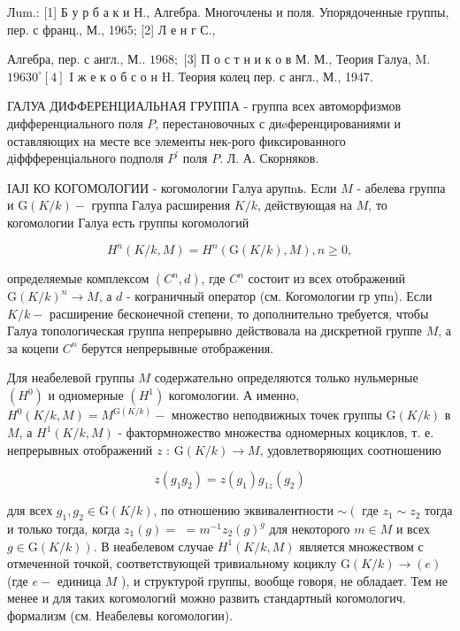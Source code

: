 \documentclass[10pt]{article}
\begin{document}
Лum.: [1] Б у р б а к и Н., Алгебра. Многочлены и поля. Упорядоченные группы, пер. с франц., М., 1965; [2] Л е н г С.,

Алгебра, пер. с англ., М.. $1968 ;$ [3] П о с т н и к о в М. М., Теория Галуа, M. $19630^{\circ}[4]$ I ж е к о б с о н H. Теория колец пер. с англ., М., 1947.



ГАЛУА ДИФФЕРЕНЦИАЛЬНАЯ ГРУППА - группа всех автоморфизмов дифференциального поля $P$, перестановочных с диøференцированиями и оставляющих на месте все элементы нек-рого фиксированного діффференціального подполя $P^{\prime}$ поля $P$. Л. А. Скорняков.



ІАЈІ КО КОГОМОЛОГИИ - когомологии Галуа арупnь. Если $M$ - абелева группа и $\mathrm{G}(K / k)-$ группа Галуа расширения $K / k$, действующая на $M$, то когомологии Галуа есть группы когомологий



\[

H^{n}(K / k, M)=H^{n}(\mathrm{G}(K / k), M), n \geqslant 0,

\]



определяемые комплексом $\left(C^{n}, d\right)$, где $C^{n}$ состоит из всех отображений $\mathrm{G}(K / k)^{n} \rightarrow M$, а $d$ - кограничный оператор (см. Когомологии гр упn). Если $K / k-$ расширение бесконечной степени, то дополнительно требуется, чтобы Галуа топологическая группа непрерывно действовала на дискретной группе $M$, а за коцепи $C^{n}$ берутся непрерывные отображения.



Для неабелевой группы $M$ содержательно определяются только нульмерные $\left(H^{0}\right)$ и одномерные $\left(H^{1}\right)$ когомологии. А именно, $H^{0}(K / k, M)=M^{\mathrm{G}(K / k)}-$ множество неподвижных точек группы $\mathrm{G}(K / k)$ в $M$, а $H^{1}(K / k, M)$ - фактормножество множества одномерных коциклов, т. е. непрерывных отображений $z$ : $\mathrm{G}(K / k) \rightarrow M$, удовлетворяющих соотношению



\[

z\left(g_{1} g_{2}\right)=z\left(g_{1}\right) g_{1 z}\left(g_{2}\right)

\]



для всех $g_{1}, g_{2} \in \mathrm{G}(K / k)$, по отношению эквивалентности $\sim\left(\right.$ где $z_{1} \sim z_{2}$ тогда и только тогда, когда $z_{1}(g)=$ $=m^{-1} z_{2}(g)^{g}$ для некоторого $m \in M$ и всех $\left.g \in \mathrm{G}(K / k)\right)$. В неабелевом случае $H^{1}(K / k, M)$ является множеством с отмеченной точкой, соответствующей тривиальному коциклу $\mathrm{G}(K / k) \rightarrow(e)$ (где $e-$ единица $M$ ), и структурой группы, вообще говоря, не обладает. Тем не менее и для таких когомологий можно развить стандартный когомологич. формализм (см. Неабелевы когомологии).
\end{document}
